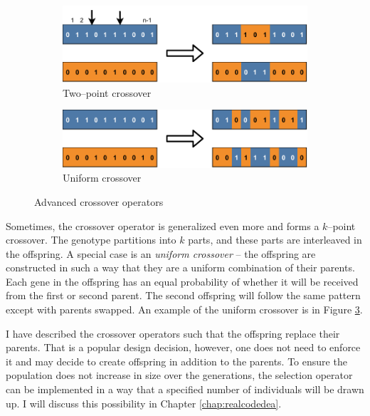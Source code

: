 \begin{figure}
    \begin{subfigure}[b]{0.4\textwidth}
        \includegraphics[width=\textwidth]{img/master_twopointcrossover.pdf}
        \caption{Two--point crossover}
        \label{fig:gatwopointcrossover}
    \end{subfigure}
    \hfill
    \begin{subfigure}[b]{0.4\textwidth}
        \includegraphics[width=\textwidth]{img/master_uniformcrossover.pdf}
        \caption{Uniform crossover}
        \label{fig:uniformcrossover}
    \end{subfigure}
    \caption{Advanced crossover operators}
\end{figure}

Sometimes, the crossover operator is generalized even more and forms a $k$--point crossover. The genotype partitions into $k$ parts, and these parts are interleaved in the offspring. A special case is an \emph{uniform crossover} -- the offspring are constructed in such a way that they are a uniform combination of their parents. Each gene in the offspring has an equal probability of whether it will be received from the first or second parent. The second offspring will follow the same pattern except with parents swapped. An example of the uniform crossover is in Figure \ref{fig:uniformcrossover}.

I have described the crossover operators such that the offspring replace their parents. That is a popular design decision, however, one does not need to enforce it and may decide to create offspring in addition to the parents. To ensure the population does not increase in size over the generations, the selection operator can be implemented in a way that a specified number of individuals will be drawn up. I will discuss this possibility in Chapter \ref{chap:realcodedea}.


